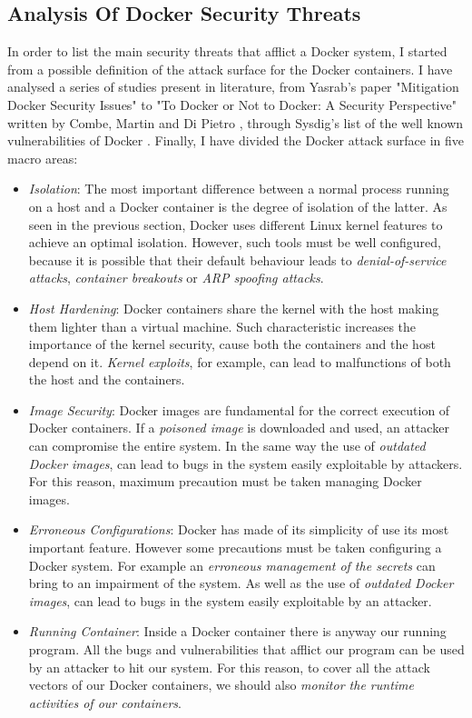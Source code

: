 \documentclass[a4paper,12pt]{article}
\begin{document}
\subsection{Analysis Of Docker Security Threats}

In order to list the main security threats that afflict a Docker system, I
started from a possible definition of the attack surface for the Docker
containers. I have analysed a series of studies present in literature, from
Yasrab's paper "Mitigation Docker Security
Issues" \cite{mitigating_docker_security_issues_yasrab} to  "To Docker or Not to
Docker: A Security Perspective" written by Combe, Martin and Di
Pietro \cite{to_docker_or_not_to_docker}, through Sysdig's list of the well known
vulnerabilities of Docker \cite{sysdig_docker_vulnerabilities}. Finally, I have
divided the Docker attack surface in five macro areas:
\begin{itemize}
  \item \textit{Isolation}: The most important difference between a normal
  process running on a host and a Docker container is the degree of isolation of
  the latter. As seen in the previous section, Docker uses different Linux
  kernel features to achieve an optimal isolation. However, such tools must be
  well configured, because it is possible that their default behaviour leads to
  \textit{denial-of-service attacks}, \textit{container breakouts} or
  \textit{ARP spoofing attacks}.
  \item \textit{Host Hardening}: Docker containers share the kernel with the
  host making them lighter than a virtual machine. Such characteristic
  increases the importance of the kernel security, cause both the containers and
  the host depend on it. \textit{Kernel exploits}, for example, can lead to
  malfunctions of both the host and the containers. 
  \item \textit{Image Security}: Docker images are fundamental for the correct
  execution of Docker containers. If a \textit{poisoned image} is downloaded and
  used, an attacker can compromise the entire system. In the same way the use of
  \textit{outdated Docker images}, can lead to bugs in the system easily
  exploitable by attackers. For this reason, maximum precaution must be taken
  managing Docker images.
  \item \textit{Erroneous Configurations}: Docker has made of its simplicity of
  use its most important feature. However some precautions must be taken
  configuring a Docker system. For example an \textit{erroneous management of
  the secrets} can bring to an impairment of the system. As well as the use of
  \textit{outdated Docker images}, can lead to bugs in the system easily
  exploitable by an attacker.
  \item \textit{Running Container}: Inside a Docker container there is anyway
  our running program. All the bugs and vulnerabilities that afflict our program
  can be used by an attacker to hit our system. For this reason, to cover all the
  attack vectors of our Docker containers, we should also \textit{monitor the
  runtime activities of our containers}.
\end{itemize}
\end{document}
